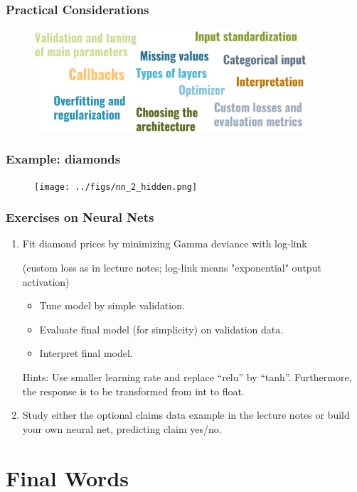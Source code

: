 \documentclass[
    utf8,
    aspectratio=169
]{beamer}  %
\begin{document}
\begin{frame}
	\frametitle{Practical Considerations}
	\begin{figure}
		\includegraphics[width=0.9\textwidth]{pics/nn_practical.png}
	\end{figure}
\end{frame}

\begin{frame}
	\frametitle{Example: diamonds}
	\begin{figure}
		\texttt{[image: ../figs/nn\_2\_hidden.png]}
	\end{figure}
\end{frame}

\begin{frame}
	\frametitle{Exercises on Neural Nets}
	\begin{enumerate}
		\item Fit diamond prices by minimizing Gamma deviance with log-link 
		
		(custom loss as in lecture notes; log-link means "exponential" output activation)
		\begin{itemize}
			\item Tune model by simple validation.
			\item Evaluate final model (for simplicity) on validation data.
			\item Interpret final model.
		\end{itemize}
		Hints: Use smaller learning rate and replace ``relu'' by ``tanh''. Furthermore, the response is to be transformed from int to float.
		
		\vfill
		
		\item Study either the optional claims data example in the lecture notes or build your own neural net, predicting claim yes/no.
	\end{enumerate}
\end{frame}

\section{Final Words}
\end{document}
